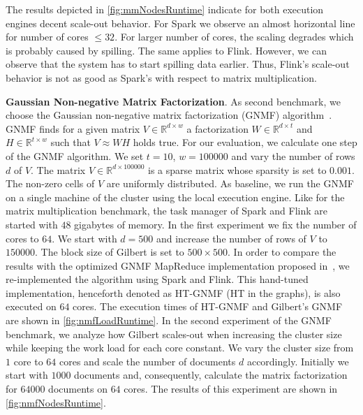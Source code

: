 The results depicted in \cref{fig:mmNodesRuntime} indicate for both execution engines decent scale-out behavior.
For Spark we observe an almost horizontal line for number of cores $\le 32$.
For larger number of cores, the scaling degrades which is probably caused by spilling.
The same applies to Flink.
However, we can observe that the system has to start spilling data earlier.
Thus, Flink's scale-out behavior is not as good as Spark's with respect to matrix multiplication.

\textbf{Gaussian Non-negative Matrix Factorization}. As second benchmark, we choose the Gaussian non-negative matrix factorization (GNMF) algorithm~\cite{seung:anips2001a}.
GNMF finds for a given matrix $V \in \mathbb{R}^{d\times w}$ a factorization $W \in \mathbb{R}^{d\times t}$ and $H \in \mathbb{R}^{t\times w}$ such that $V\approx W H$ holds true.
For our evaluation, we calculate one step of the GNMF algorithm.
We set $t=10$, $w=100000$ and vary the number of rows $d$ of $V$.
The matrix $V\in\mathbb{R}^{d\times 100000}$ is a sparse matrix whose sparsity is set to $0.001$.
The non-zero cells of $V$ are uniformly distributed.
As baseline, we run the GNMF on a single machine of the cluster using the local execution engine.
Like for the matrix multiplication benchmark, the task manager of Spark and Flink are started with $48$ gigabytes of memory.
In the first experiment we fix the number of cores to $64$.
We start with $d=500$ and increase the number of rows of $V$ to $150000$.
The block size of Gilbert is set to $500 \times 500$.
In order to compare the results with the optimized GNMF MapReduce implementation proposed in~\cite{liu:2010a}, we re-implemented the algorithm using  Spark and Flink.
This hand-tuned implementation, henceforth denoted as HT-GNMF (HT in the graphs), is also executed on $64$ cores.
The execution times of HT-GNMF and Gilbert's GNMF are shown in \cref{fig:nmfLoadRuntime}.
In the second experiment of the GNMF benchmark, we analyze how Gilbert scales-out when increasing the cluster size while keeping the work load for each core constant.
We vary the cluster size from $1$ core to $64$ cores and scale the number of documents $d$ accordingly.
Initially we start with $1000$ documents and, consequently, calculate the matrix factorization for $64000$ documents on $64$ cores.
The results of this experiment are shown in \cref{fig:nmfNodesRuntime}.
